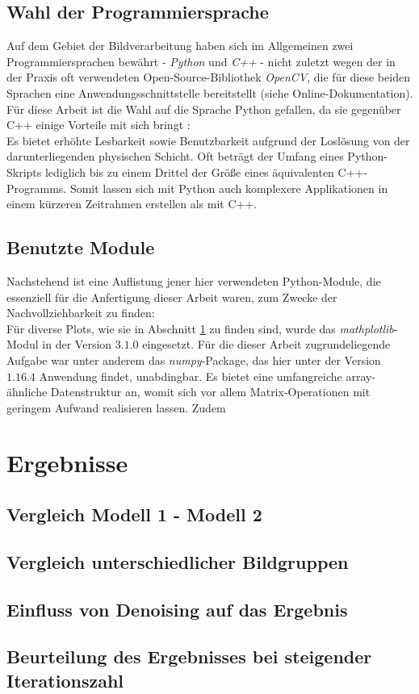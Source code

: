 		\subsection{Wahl der Programmiersprache}
		\label{sub:prog-lang}
			Auf dem Gebiet der Bildverarbeitung haben sich im Allgemeinen zwei Programmiersprachen bewährt - \textit{Python} und \textit{C++} - nicht zuletzt wegen der in der Praxis oft verwendeten Open-Source-Bibliothek \textit{OpenCV}, die für diese beiden Sprachen eine Anwendungsschnittstelle bereitstellt (siehe Online-Dokumentation). Für diese Arbeit ist die Wahl auf die Sprache Python gefallen, da sie gegenüber C++ einige Vorteile mit sich bringt \cite[S. 21f]{python-book}:\\
			Es bietet erhöhte Lesbarkeit sowie Benutzbarkeit aufgrund der Loslösung von der darunterliegenden physischen Schicht. Oft beträgt der Umfang eines Python-Skripts lediglich bis zu einem Drittel der Größe eines äquivalenten C++-Programms. Somit lassen sich mit Python auch komplexere Applikationen in einem kürzeren Zeitrahmen erstellen als mit C++. 

		\subsection{Benutzte Module}
		\label{sub:used-modules}
			Nachstehend ist eine Auflistung jener hier verwendeten Python-Module, die essenziell für die Anfertigung dieser Arbeit waren, zum Zwecke der Nachvollziehbarkeit zu finden:\\
			Für diverse Plots, wie sie in Abschnitt \ref{sec:results} zu finden sind, wurde das \textit{mathplotlib}-Modul in der Version $3.1.0$ eingesetzt. Für die dieser Arbeit zugrundeliegende Aufgabe war unter anderem das \textit{numpy}-Package, das hier unter der Version $1.16.4$ Anwendung findet, unabdingbar. Es bietet eine umfangreiche array-ähnliche Datenstruktur an, womit sich vor allem Matrix-Operationen mit geringem Aufwand realisieren lassen. Zudem 
		
	\section{Ergebnisse}
	\label{sec:results}
	
		\subsection{Vergleich Modell 1 - Modell 2}
		\label{sub:comp-m1-m2}
		
		\subsection{Vergleich unterschiedlicher Bildgruppen}
		\label{sub:comp-diff-images}
		
		\subsection{Einfluss von Denoising auf das Ergebnis}
		\label{sub:influence-of-denoising}
		
		\subsection{Beurteilung des Ergebnisses bei steigender Iterationszahl}
		\label{sub:judging-higher-iteration}